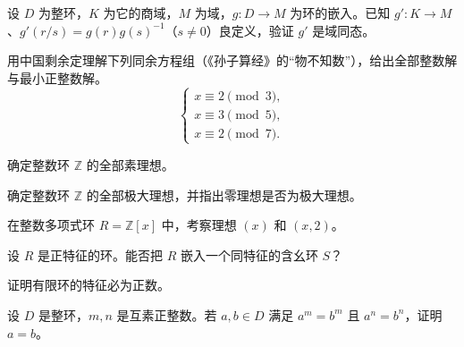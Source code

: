 \noindent\begin{minipage}{\textwidth}
设 $D$ 为整环，$K$ 为它的商域，$M$ 为域，$g\colon D\to M$ 为环的嵌入。已知 $g'\colon K\to M$、$g'(r/s)=g(r)g(s)^{-1}$（$s\ne0$）良定义，验证 $g'$ 是域同态。
\end{minipage}\par\vfill
\newpage
\noindent\begin{minipage}{\textwidth}
用中国剩余定理解下列同余方程组（《孙子算经》的“物不知数”），给出全部整数解与最小正整数解。
\[
\begin{cases}
x\equiv 2\pmod{3},\\
x\equiv 3\pmod{5},\\
x\equiv 2\pmod{7}.
\end{cases}
\]
\end{minipage}\par\vfill
\noindent\begin{minipage}{\textwidth}
确定整数环 $\mathbb{Z}$ 的全部素理想。
\end{minipage}\par\vfill
\noindent\begin{minipage}{\textwidth}
确定整数环 $\mathbb{Z}$ 的全部极大理想，并指出零理想是否为极大理想。
\end{minipage}\par\vfill
\newpage
\noindent\begin{minipage}{\textwidth}
在整数多项式环 $R=\mathbb{Z}[x]$ 中，考察理想 $(x)$ 和 $(x,2)$。
\end{minipage}\par\vfill
\noindent\begin{minipage}{\textwidth}
设 $R$ 是正特征的环。能否把 $R$ 嵌入一个同特征的含幺环 $S$？
\end{minipage}\par\vfill
\noindent\begin{minipage}{\textwidth}
证明有限环的特征必为正数。
\end{minipage}\par\vfill
\newpage
\noindent\begin{minipage}{\textwidth}
设 $D$ 是整环，$m,n$ 是互素正整数。若 $a,b\in D$ 满足 $a^m=b^m$ 且 $a^n=b^n$，证明 $a=b$。
\end{minipage}\par\vfill
